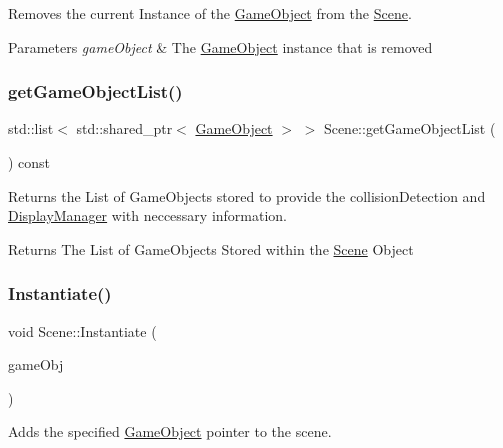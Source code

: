 Removes the current Instance of the \hyperlink{class_game_object}{Game\+Object} from the \hyperlink{class_scene}{Scene}. 


\begin{DoxyParams}{Parameters}
{\em game\+Object} & The \hyperlink{class_game_object}{Game\+Object} instance that is removed \\
\hline
\end{DoxyParams}
\mbox{\label{class_scene_a717b5fcf248038c51b205b022301318f}} 
\subsubsection{\texorpdfstring{get\+Game\+Object\+List()}{getGameObjectList()}}
{\footnotesize\ttfamily std\+::list$<$ std\+::shared\+\_\+ptr$<$ \hyperlink{class_game_object}{Game\+Object} $>$ $>$ Scene\+::get\+Game\+Object\+List (\begin{DoxyParamCaption}{ }\end{DoxyParamCaption}) const}



Returns the List of Game\+Objects stored to provide the collision\+Detection and \hyperlink{class_display_manager}{Display\+Manager} with neccessary information. 

\begin{DoxyReturn}{Returns}
The List of Game\+Objects Stored within the \hyperlink{class_scene}{Scene} Object 
\end{DoxyReturn}
\mbox{\label{class_scene_a3dd730cba4a22bf75e54c4b644c26976}} 
\subsubsection{\texorpdfstring{Instantiate()}{Instantiate()}}
{\footnotesize\ttfamily void Scene\+::\+Instantiate (\begin{DoxyParamCaption}\item[{shared\+\_\+ptr$<$ \hyperlink{class_game_object}{Game\+Object} $>$}]{game\+Obj }\end{DoxyParamCaption})}



Adds the specified \hyperlink{class_game_object}{Game\+Object} pointer to the scene. 


